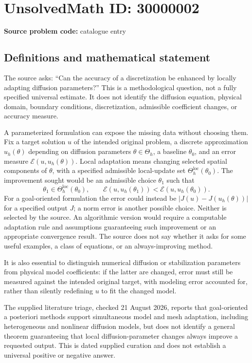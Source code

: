 \documentclass[11pt]{article}
\begin{document}
\section*{UnsolvedMath ID: 30000002}
\textbf{Source problem code:} catalogue entry
\subsection{Definitions and mathematical statement}
The source asks: ``Can the accuracy of a discretization be enhanced by locally adapting diffusion parameters?'' This is a methodological question, not a fully specified universal estimate. It does not identify the diffusion equation, physical domain, boundary conditions, discretization, admissible coefficient changes, or accuracy measure.

A parameterized formulation can expose the missing data without choosing them. Fix a target solution $u$ of the intended original problem, a discrete approximation $u_h(\theta)$ depending on diffusion parameters $\theta\in\Theta_h$, a baseline $\theta_0$, and an error measure $\mathcal E(u,u_h(\theta))$. Local adaptation means changing selected spatial components of $\theta$, with a specified admissible local-update set $\Theta_h^{\mathrm{loc}}(\theta_0)$. The improvement sought would be an admissible choice $\theta_1$ such that
\[
 \theta_1\in\Theta_h^{\mathrm{loc}}(\theta_0),\qquad
 \mathcal E(u,u_h(\theta_1))<\mathcal E(u,u_h(\theta_0)).
\]
For a goal-oriented formulation the error could instead be $|J(u)-J(u_h(\theta))|$ for a specified output $J$; a norm error is another possible choice. Neither is selected by the source. An algorithmic version would require a computable adaptation rule and assumptions guaranteeing such improvement or an appropriate convergence result. The source does not say whether it asks for some useful examples, a class of equations, or an always-improving method.

It is also essential to distinguish numerical diffusion or stabilization parameters from physical model coefficients: if the latter are changed, error must still be measured against the intended original target, with modeling error accounted for, rather than silently redefining $u$ to fit the changed model.

The supplied literature triage, checked 21 August 2026, reports that goal-oriented a posteriori methods support simultaneous model and mesh adaptation, including heterogeneous and nonlinear diffusion models, but does not identify a general theorem guaranteeing that local diffusion-parameter changes always improve a requested output. This is dated supplied curation and does not establish a universal positive or negative answer.
\end{document}
